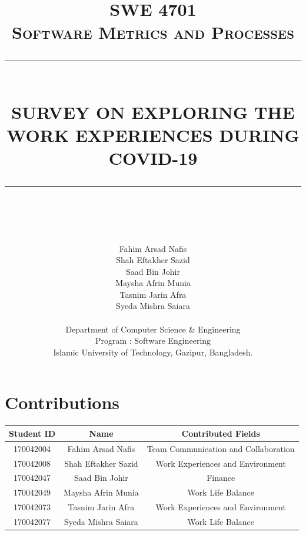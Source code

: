\documentclass[11pt]{article}
\newcommand{\HRule}[1]{\rule{\linewidth}{#1}}
\begin{document}
\title{ \normalsize \textsc{SWE 4701\\
Software Metrics and Processes}
		\\ [2.0cm]
		\HRule{0.5pt} \\
		\LARGE \textbf{\uppercase{Survey on Exploring The Work Experiences During COVID-19}}
		\HRule{.5pt} \\ [0.5cm]
		\normalsize  \vspace*{5\baselineskip}}

\date{}

\author{
        Fahim Arsad Nafis\\
        Shah Eftakher Sazid\\
        Saad Bin Johir\\
        Maysha Afrin Munia\\
        Tasnim Jarin Afra\\
        Syeda Mishra Saiara\\
        \\
		Department of Computer Science \& Engineering\\ 
		Program : Software Engineering\\
		Islamic University of Technology, Gazipur, Bangladesh.}

\maketitle
\newpage

\section*{Contributions}
\begin{center}
\begin{tabular}{ | c | c| c | }
\hline
 \textbf{Student ID} & \textbf{Name} & \textbf{Contributed Fields} \\
 \hline
 170042004 & Fahim Arsad Nafis & Team Communication and Collaboration  \\
 \hline
 170042008 & Shah Eftakher Sazid & Work Experiences and Environment \\ 
 \hline
 170042047 & Saad Bin Johir & Finance \\
 \hline
 170042049 & Maysha Afrin Munia & Work Life Balance \\
 \hline
 170042073 & Tasnim Jarin Afra & Work Experiences and Environment \\
 \hline
 170042077 & Syeda Mishra Saiara & Work Life Balance \\
 \hline
\end{tabular}
\end{center}
\end{document}
